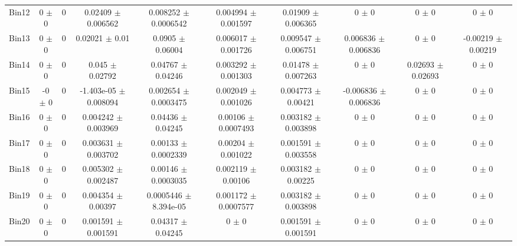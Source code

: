 \begin{tabular}{@{\extracolsep{4pt}}lccccccccc@{}}
     Bin12 & 0 $\pm$ 0 & 0 & 0.02409 $\pm$ 0.006562 & 0.008252 $\pm$ 0.0006542 & 0.004994 $\pm$ 0.001597 & 0.01909 $\pm$ 0.006365 & 0 $\pm$ 0 & 0 $\pm$ 0 & 0 $\pm$ 0 \\ 
     Bin13 & 0 $\pm$ 0 & 0 & 0.02021 $\pm$ 0.01 & 0.0905 $\pm$ 0.06004 & 0.006017 $\pm$ 0.001726 & 0.009547 $\pm$ 0.006751 & 0.006836 $\pm$ 0.006836 & 0 $\pm$ 0 & -0.00219 $\pm$ 0.00219 \\ 
     Bin14 & 0 $\pm$ 0 & 0 & 0.045 $\pm$ 0.02792 & 0.04767 $\pm$ 0.04246 & 0.003292 $\pm$ 0.001303 & 0.01478 $\pm$ 0.007263 & 0 $\pm$ 0 & 0.02693 $\pm$ 0.02693 & 0 $\pm$ 0 \\ 
     Bin15 & -0 $\pm$ 0 & 0 & -1.403e-05 $\pm$ 0.008094 & 0.002654 $\pm$ 0.0003475 & 0.002049 $\pm$ 0.001026 & 0.004773 $\pm$ 0.00421 & -0.006836 $\pm$ 0.006836 & 0 $\pm$ 0 & 0 $\pm$ 0 \\ 
     Bin16 & 0 $\pm$ 0 & 0 & 0.004242 $\pm$ 0.003969 & 0.04436 $\pm$ 0.04245 & 0.00106 $\pm$ 0.0007493 & 0.003182 $\pm$ 0.003898 & 0 $\pm$ 0 & 0 $\pm$ 0 & 0 $\pm$ 0 \\ 
     Bin17 & 0 $\pm$ 0 & 0 & 0.003631 $\pm$ 0.003702 & 0.00133 $\pm$ 0.0002339 & 0.00204 $\pm$ 0.001022 & 0.001591 $\pm$ 0.003558 & 0 $\pm$ 0 & 0 $\pm$ 0 & 0 $\pm$ 0 \\ 
     Bin18 & 0 $\pm$ 0 & 0 & 0.005302 $\pm$ 0.002487 & 0.00146 $\pm$ 0.0003035 & 0.002119 $\pm$ 0.00106 & 0.003182 $\pm$ 0.00225 & 0 $\pm$ 0 & 0 $\pm$ 0 & 0 $\pm$ 0 \\ 
     Bin19 & 0 $\pm$ 0 & 0 & 0.004354 $\pm$ 0.00397 & 0.0005446 $\pm$ 8.394e-05 & 0.001172 $\pm$ 0.0007577 & 0.003182 $\pm$ 0.003898 & 0 $\pm$ 0 & 0 $\pm$ 0 & 0 $\pm$ 0 \\ 
     Bin20 & 0 $\pm$ 0 & 0 & 0.001591 $\pm$ 0.001591 & 0.04317 $\pm$ 0.04245 & 0 $\pm$ 0 & 0.001591 $\pm$ 0.001591 & 0 $\pm$ 0 & 0 $\pm$ 0 & 0 $\pm$ 0 \\ 
\hline\hline
  \end{tabular}
